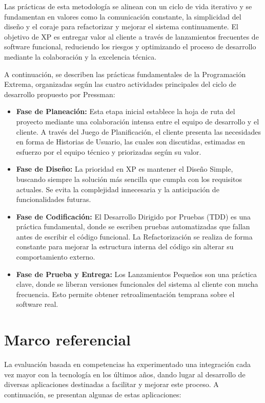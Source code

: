 Las prácticas de esta metodología se alinean con un ciclo de vida iterativo y se fundamentan en valores como la comunicación constante, la simplicidad del diseño y el coraje para refactorizar y mejorar el sistema continuamente. El objetivo de XP es entregar valor al cliente a través de lanzamientos frecuentes de software funcional, reduciendo los riesgos y optimizando el proceso de desarrollo mediante la colaboración y la excelencia técnica.

A continuación, se describen las prácticas fundamentales de la Programación Extrema, organizadas según las cuatro actividades principales del ciclo de desarrollo propuesto por Pressman:

\begin{itemize}[leftmargin=*]
  \item \textbf{Fase de Planeación:} Esta etapa inicial establece la hoja de ruta del proyecto mediante una colaboración intensa entre el equipo de desarrollo y el cliente. A través del Juego de Planificación, el cliente presenta las necesidades en forma de Historias de Usuario, las cuales son discutidas, estimadas en esfuerzo por el equipo técnico y priorizadas según su valor.
  \item \textbf{Fase de Diseño:} La prioridad en XP es mantener el Diseño Simple, buscando siempre la solución más sencilla que cumpla con los requisitos actuales. Se evita la complejidad innecesaria y la anticipación de funcionalidades futuras.
  \item \textbf{Fase de Codificación:} El Desarrollo Dirigido por Pruebas (TDD) es una práctica fundamental, donde se escriben pruebas automatizadas que fallan antes de escribir el código funcional. La Refactorización se realiza de forma constante para mejorar la estructura interna del código sin alterar su comportamiento externo.
  \item \textbf{Fase de Prueba y Entrega:} Los Lanzamientos Pequeños son una práctica clave, donde se liberan versiones funcionales del sistema al cliente con mucha frecuencia. Esto permite obtener retroalimentación temprana sobre el software real.
\end{itemize}

\section{Marco referencial}

La evaluación basada en competencias ha experimentado una integración cada vez mayor con la tecnología en los últimos años, dando lugar al desarrollo de diversas aplicaciones destinadas a facilitar y mejorar este proceso. A continuación, se presentan algunas de estas aplicaciones:

